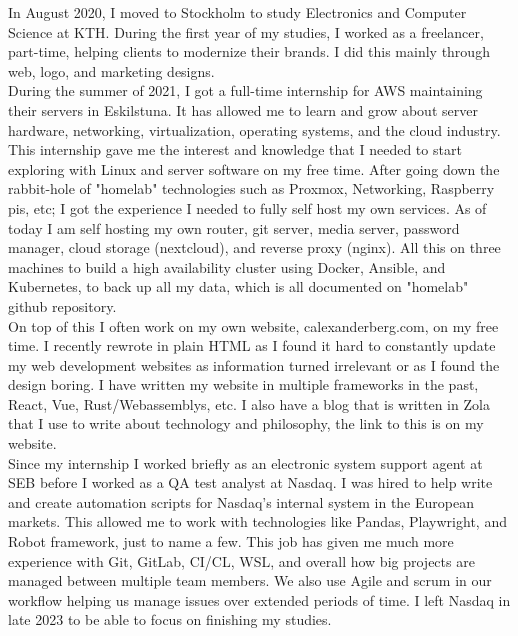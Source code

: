 \documentclass[../main.tex]{subfiles}
\begin{document}
\par
In August 2020, I moved to Stockholm to study Electronics and Computer Science at KTH. During the first year of my studies, I worked as a freelancer, part-time, helping clients to modernize their brands. I did this mainly through web, logo, and marketing designs.
\\

During the summer of 2021, I got a full-time internship for AWS maintaining their servers in Eskilstuna. It has allowed me to learn and grow about server hardware, networking, virtualization, operating systems, and the cloud industry.
\\

This internship gave me the interest and knowledge that I needed to start exploring with Linux and server software on my free time. After going down the rabbit-hole of "homelab" technologies such as Proxmox, Networking, Raspberry pis, etc; I got the experience I needed to fully self host my own services. As of today I am self hosting my own router, git server, media server, password manager, cloud storage (nextcloud), and reverse proxy (nginx). All this on three machines to build a high availability cluster using Docker, Ansible, and Kubernetes, to back up all my data, which is all documented on "homelab" github repository.
\\

On top of this I often work on my own website, calexanderberg.com, on my free time. I recently rewrote in plain HTML as I found it hard to constantly update my web development websites as information turned irrelevant or as I found the design boring. I have written my website in multiple frameworks in the past, React, Vue, Rust/Webassemblys, etc. I also have a blog that is written in Zola that I use to write about technology and philosophy, the link to this is on my website.
\\

Since my internship I worked briefly as an electronic system support agent at SEB before I worked as a QA test analyst at Nasdaq. I was hired to help write and create automation scripts for Nasdaq's internal system in the European markets. This allowed me to work with technologies like Pandas, Playwright, and Robot framework, just to name a few. This job has given me much more experience with Git, GitLab, CI/CL, WSL, and overall how big projects are managed between multiple team members. We also use Agile and scrum in our workflow helping us manage issues over extended periods of time. I left Nasdaq in late 2023 to be able to focus on finishing my studies.
\\
\end{document}
